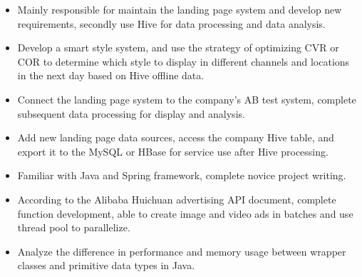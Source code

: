 \documentclass{resume}
\begin{document}

\begin{itemize}
  \item Mainly responsible for maintain the landing page system and develop new requirements, secondly use Hive for data processing and data analysis.
  \item Develop a smart style system, and use the strategy of optimizing CVR or COR to determine which style to display in different channels and locations in the next day based on Hive offline data.
  \item Connect the landing page system to the company's AB test system, complete subsequent data processing for display and analysis.
  \item Add new landing page data sources, access the company Hive table, and export it to the MySQL or HBase for service use after Hive processing.
\end{itemize}

\begin{itemize}
  \item Familiar with Java and Spring framework, complete novice project writing.
  \item According to the Alibaba Huichuan advertising API document, complete function development, able to create image and video ads in batches and use thread pool to parallelize.
  \item Analyze the difference in performance and memory usage between wrapper classes and primitive data types in Java.
\end{itemize}

\end{document}
